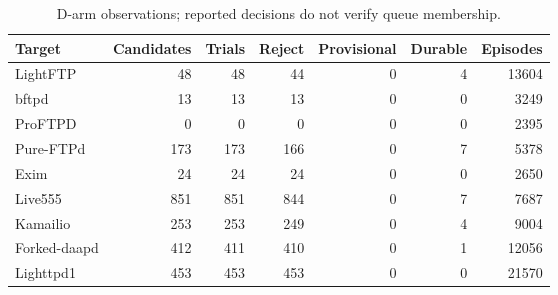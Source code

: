 \begin{table}[!tbp]
\centering\small
\caption{D-arm observations; reported decisions do not verify queue membership.}
\label{tab:observed_log_counts}
\begin{tabular}{lrrrrrr}
\toprule
Target & Candidates & Trials & Reject & Provisional & Durable & Episodes \\
\midrule
LightFTP & 48 & 48 & 44 & 0 & 4 & 13604 \\
bftpd & 13 & 13 & 13 & 0 & 0 & 3249 \\
ProFTPD & 0 & 0 & 0 & 0 & 0 & 2395 \\
Pure-FTPd & 173 & 173 & 166 & 0 & 7 & 5378 \\
Exim & 24 & 24 & 24 & 0 & 0 & 2650 \\
Live555 & 851 & 851 & 844 & 0 & 7 & 7687 \\
Kamailio & 253 & 253 & 249 & 0 & 4 & 9004 \\
Forked-daapd & 412 & 411 & 410 & 0 & 1 & 12056 \\
Lighttpd1 & 453 & 453 & 453 & 0 & 0 & 21570 \\
\bottomrule
\end{tabular}
\end{table}

